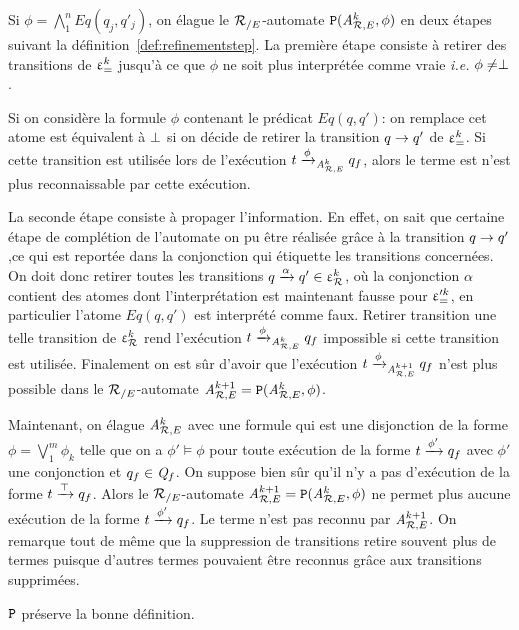 Si  $\phi= \bigwedge_1^n Eq(q_j, q'_j)$, on élague le
${\mathcal R_{/E}}$-automate $\mathtt{P}({\mathit A}_{\mathcal R,E}^k, \phi)$ en deux étapes suivant la définition~\ref{def:refinementstep}.
La première étape consiste à retirer des transitions de $\upvarepsilon_{=}^k$ jusqu'à ce que $\phi$
ne soit plus interprétée comme vraie {\em i.e.} $\phi \neq \perp$.

Si on considère la formule $\phi$ contenant le prédicat $Eq(q,q')$: on
remplace cet atome est équivalent à  $\perp$ si on décide de retirer la
transition $q \rightarrow q'$ de $\upvarepsilon_{=}^k$. Si cette transition est utilisée lors de l'exécution 
$t \xrightarrow{\phi}_{{\mathit A}_{\mathcal R,E}^k} q_f$, alors le terme est n'est plus reconnaissable par cette exécution.

La seconde étape consiste à propager l'information. En effet, 
on sait que certaine étape de complétion de l'automate on pu être
réalisée grâce à la transition $q \rightarrow q'$,ce qui est reportée dans 
la conjonction qui étiquette les transitions concernées.
On doit donc retirer toutes les transitions $q \xrightarrow{\alpha} q' \in \upvarepsilon_{\mathcal R}^k$, 
où la conjonction $\alpha$ contient des atomes dont l'interprétation est 
maintenant fausse pour $\upvarepsilon_{=}'^k$, en particulier l'atome $Eq(q,q')$ est interprété
comme faux. Retirer transition une telle transition de $\upvarepsilon_{\mathcal R}^k$ rend l'exécution 
$t \xrightarrow{\phi}_{{\mathit A}_{\mathcal R,E}^k} q_f$ impossible si cette transition est utilisée.
Finalement on est sûr d'avoir que l'exécution $t \xrightarrow{\phi}_{{\mathit A}_{\mathcal R,E}^{k+1}} q_f$
n'est plus possible dans le ${\mathcal R_{/E}}$-automate ${\mathit A}_{\mathcal R,E}^{k+1} = \mathtt{P}({\mathit A}_{\mathcal R,E}^k, \phi)$.

Maintenant, on élague ${\mathit A}_{\mathcal R,E}^k$ avec une formule qui est une disjonction de la forme $\phi = \bigvee_1^m \phi_k$
telle que on a $\phi'\models \phi$ pour toute exécution de la forme $t \xrightarrow{\phi'} q_f$ avec $\phi'$ une conjonction et 
$q_f \in \mathit Q_f$. On suppose bien sûr qu'il n'y a pas d'exécution de la forme $t \xrightarrow{\top} q_f$.
Alors le ${\mathcal R_{/E}}$-automate ${\mathit A}_{\mathcal R,E}^{k+1} = \mathtt{P}({\mathit A}_{\mathcal R,E}^k, \phi)$ ne permet plus aucune exécution de la forme
$t \xrightarrow{\phi'} q_f$. Le terme n'est pas reconnu par ${\mathit A}_{\mathcal R,E}^{k+1}$.
On remarque tout de même que la suppression de transitions retire souvent plus de termes  
puisque d'autres termes pouvaient être reconnus grâce aux transitions supprimées.

\begin{property}
   $\mathtt{P}$ préserve la bonne définition.
\end{property}

